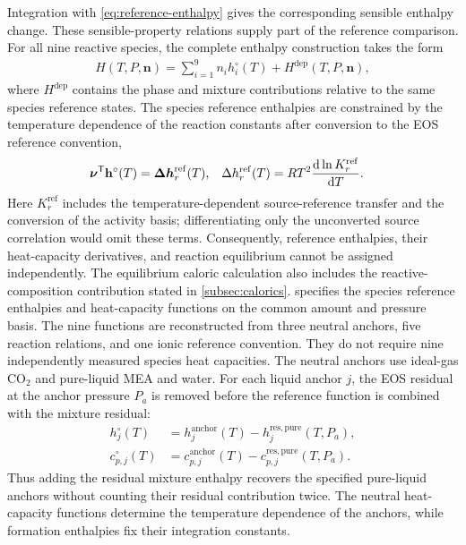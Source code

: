 Integration with \cref{eq:reference-enthalpy} gives the corresponding sensible enthalpy change.
These sensible-property relations supply part of the reference comparison.
For all nine reactive species, the complete enthalpy construction takes the form
\begin{align}
H(T,P,\mathbf n)=\sum_{i=1}^{9}n_i h_i^\circ(T)+H^{\mathrm{dep}}(T,P,\mathbf n),
\end{align}
where $H^{\mathrm{dep}}$ contains the phase and mixture contributions relative to the same species reference states.
The species reference enthalpies are constrained by the temperature dependence of the reaction constants after conversion to the EOS reference convention,
\begin{align}
\boldsymbol\nu^{\mathsf T}\mathbf h^\circ(T)
&=\boldsymbol{\Delta h}_{r}^{\mathrm{ref}}(T),&
\Delta h_{r}^{\mathrm{ref}}(T)&=RT^2\odv{\ln K_r^{\mathrm{ref}}}{T}.
\label{eq:reaction-reference-enthalpy}
\end{align}
Here $K_r^{\mathrm{ref}}$ includes the temperature-dependent source-reference transfer and the conversion of the activity basis; differentiating only the unconverted source correlation would omit these terms.
Consequently, reference enthalpies, their heat-capacity derivatives, and reaction equilibrium cannot be assigned independently.
The equilibrium caloric calculation also includes the reactive-composition contribution stated in \cref{subsec:calorics}.
 specifies the species reference enthalpies and heat-capacity functions on the common amount and pressure basis.
The nine functions are reconstructed from three neutral anchors, five reaction relations, and one ionic reference convention.
They do not require nine independently measured species heat capacities.
The neutral anchors use ideal-gas CO$_2$ and pure-liquid MEA and water.
For each liquid anchor $j$, the EOS residual at the anchor pressure $P_a$ is removed before the reference function is combined with the mixture residual:
\begin{align}
h_j^\circ(T)&=h_j^{\mathrm{anchor}}(T)-h_j^{\mathrm{res,pure}}(T,P_a),\\
c_{p,j}^\circ(T)&=c_{p,j}^{\mathrm{anchor}}(T)-c_{p,j}^{\mathrm{res,pure}}(T,P_a).
\label{eq:neutral-caloric-anchor}
\end{align}
Thus adding the residual mixture enthalpy recovers the specified pure-liquid anchors without counting their residual contribution twice.
The neutral heat-capacity functions determine the temperature dependence of the anchors, while formation enthalpies fix their integration constants.

